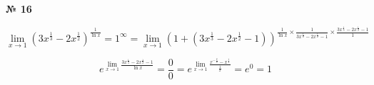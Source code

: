 \documentclass{article}
\begin{document}
\textbf{№ 16} 

\begingroup
\Large

$$ \lim\limits_{x\to 1} \left( 3x^{\frac{1}{3}} - 2x^{\frac{1}{2}} \right)^{\frac{1}{\ln{x}}}
= 1^{\infty}
= \lim\limits_{x\to 1} \left( 1 + (3x^{\frac{1}{3}} - 2x^{\frac{1}{2}} - 1) \right)^{\frac{1}{\ln{x}} \times \frac{1}{3x^{\frac{1}{3}} - 2x^{\frac{1}{2}} - 1} \times \frac{3x^{\frac{1}{3}} - 2x^{\frac{1}{2}} - 1}{1}}$$

$$ e^{\lim\limits_{x\to 1} \frac{3x^{\frac{1}{3}} - 2x^{\frac{1}{2}} - 1}{\ln{x}}}
= \frac{0}{0}
= e^{\lim\limits_{x\to 1} \frac{x^{-\frac{2}{3}} - x^{\frac{1}{2}}}{\frac{1}{x}}}
= e^{0}
= 1$$

\endgroup
\end{document}
